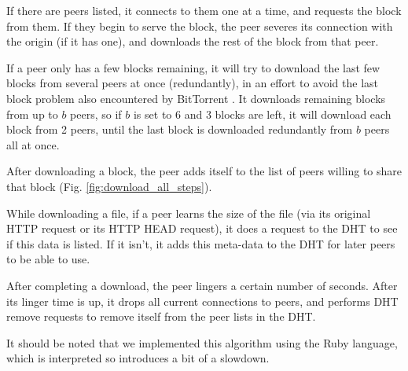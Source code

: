 If there are peers listed, it connects to them one at a time, and requests the block from them.  If they begin to serve the block, the peer severes its connection with the origin (if it has one),
and downloads the rest of the block from that peer.

If a peer only has a few blocks remaining, it will try to download the last few blocks from several peers at once (redundantly), in an effort to avoid the last block problem also
encountered by BitTorrent \cite{bram}.  It downloads remaining blocks from up to $b$ peers, so if $b$ is set to 6 and 3 blocks are left, it will download each block from 2 peers, until
the last block is downloaded redundantly from $b$ peers all at once.

After downloading a block, the peer adds itself to the list of peers willing to share that block (Fig. \ref{fig:download_all_steps}). 

While downloading a file, if a peer learns the size of the file (via its original HTTP request or its HTTP HEAD request), it does a request to the DHT to see if this
data is listed.  If it isn't, it adds this meta-data to the DHT for later peers to be able to use.

After completing a download, the peer lingers a certain number of seconds.  After its linger time is up, it drops all current connections to peers, and performs DHT remove requests to
remove itself from the peer lists in the DHT.

It should be noted that we implemented this algorithm using the Ruby language, which is interpreted so introduces a bit of a slowdown.

